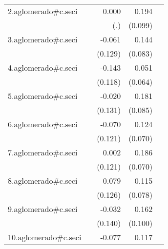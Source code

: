 {\begin{longtable}{l*{4}{D{.}{.}{-1}}}
\addlinespace
2.aglomerado#c.seci&                     &       0.000         &       0.194\sym{*}  &                     \\
            &                     &         (.)         &     (0.099)         &                     \\
\addlinespace
3.aglomerado#c.seci&                     &      -0.061         &       0.144         &                     \\
            &                     &     (0.129)         &     (0.083)         &                     \\
\addlinespace
4.aglomerado#c.seci&                     &      -0.143         &       0.051         &                     \\
            &                     &     (0.118)         &     (0.064)         &                     \\
\addlinespace
5.aglomerado#c.seci&                     &      -0.020         &       0.181\sym{*}  &                     \\
            &                     &     (0.131)         &     (0.085)         &                     \\
\addlinespace
6.aglomerado#c.seci&                     &      -0.070         &       0.124         &                     \\
            &                     &     (0.121)         &     (0.070)         &                     \\
\addlinespace
7.aglomerado#c.seci&                     &       0.002         &       0.186\sym{**} &                     \\
            &                     &     (0.121)         &     (0.070)         &                     \\
\addlinespace
8.aglomerado#c.seci&                     &      -0.079         &       0.115         &                     \\
            &                     &     (0.126)         &     (0.078)         &                     \\
\addlinespace
9.aglomerado#c.seci&                     &      -0.032         &       0.162         &                     \\
            &                     &     (0.140)         &     (0.100)         &                     \\
\addlinespace
10.aglomerado#c.seci&                     &      -0.077         &       0.117         &                     \\

\end{longtable}}
